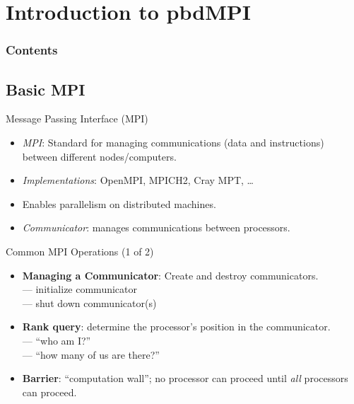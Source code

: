 \section[pbdMPI]{Introduction to pbdMPI}

\hidenum
\begin{frame}[noframenumbering]
\frametitle{Contents}
 \tableofcontents[currentsection,hideothersubsections,sectionstyle=show/hide]
\end{frame}
\shownum

\subsection{Basic MPI}

\begin{frame}
  \begin{block}{Message Passing Interface (MPI)}\pause
    \begin{itemize}
      \item \textit{MPI}: Standard for managing communications (data and instructions) between different nodes/computers.
      \item \textit{Implementations}:  OpenMPI, MPICH2, Cray MPT, \dots
      \item Enables parallelism on distributed machines.
      \item \textit{Communicator}: manages communications between processors.
    \end{itemize}
  \end{block}
\end{frame}


\begin{frame}
  \begin{block}{Common MPI Operations (1 of 2)}\pause
    \begin{itemize}
      \item \textbf{Managing a Communicator}:  Create and destroy communicators.\\
       --- initialize communicator\\
       --- shut down communicator(s)
      \\[.4cm]
      \item \textbf{Rank query}: determine the processor's position in the communicator.\\
       --- ``who am I?''\\
       --- ``how many of us are there?''\\[.4cm]
      \item \textbf{Barrier}: ``computation wall''; no processor can proceed until \emph{all} processors can proceed.\\
      \\[.4cm]
    \end{itemize}
  \end{block}
\end{frame}


